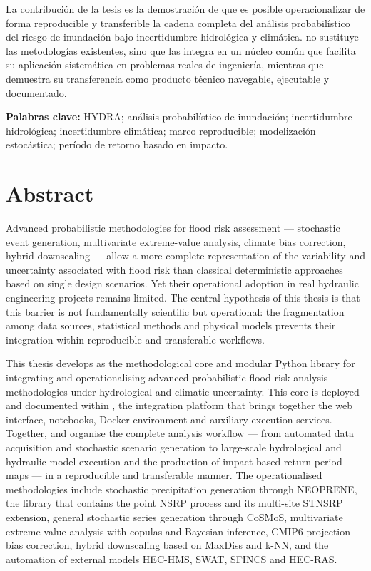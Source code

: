 La contribución de la tesis es la demostración de que es posible operacionalizar de forma reproducible y transferible la cadena completa del análisis probabilístico del riesgo de inundación bajo incertidumbre hidrológica y climática. \pyhydra no sustituye las metodologías existentes, sino que las integra en un núcleo común que facilita su aplicación sistemática en problemas reales de ingeniería, mientras que \hydra demuestra su transferencia como producto técnico navegable, ejecutable y documentado.

\textbf{Palabras clave:} HYDRA; análisis probabilístico de inundación; incertidumbre hidrológica; incertidumbre climática; marco reproducible; modelización estocástica; período de retorno basado en impacto.


\chapter*{Abstract}

Advanced probabilistic methodologies for flood risk assessment --- stochastic event generation, multivariate extreme-value analysis, climate bias correction, hybrid downscaling --- allow a more complete representation of the variability and uncertainty associated with flood risk than classical deterministic approaches based on single design scenarios. Yet their operational adoption in real hydraulic engineering projects remains limited. The central hypothesis of this thesis is that this barrier is not fundamentally scientific but operational: the fragmentation among data sources, statistical methods and physical models prevents their integration within reproducible and transferable workflows.

This thesis develops \pyhydra as the methodological core and modular Python library for integrating and operationalising advanced probabilistic flood risk analysis methodologies under hydrological and climatic uncertainty. This core is deployed and documented within \hydra, the integration platform that brings together the web interface, notebooks, Docker environment and auxiliary execution services. Together, \pyhydra and \hydra organise the complete analysis workflow --- from automated data acquisition and stochastic scenario generation to large-scale hydrological and hydraulic model execution and the production of impact-based return period maps --- in a reproducible and transferable manner. The operationalised methodologies include stochastic precipitation generation through NEOPRENE, the library that contains the point NSRP process and its multi-site STNSRP extension, general stochastic series generation through CoSMoS, multivariate extreme-value analysis with copulas and Bayesian inference, CMIP6 projection bias correction, hybrid downscaling based on MaxDiss and k-NN, and the automation of external models HEC-HMS, SWAT, SFINCS and HEC-RAS.

